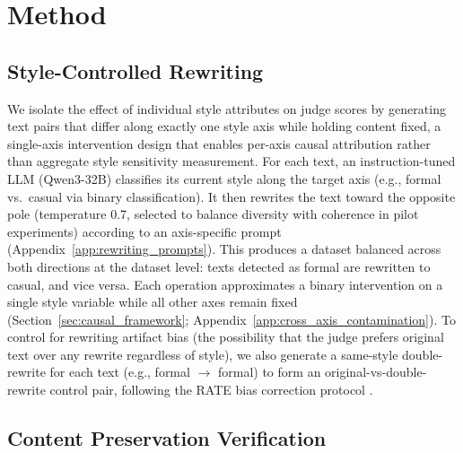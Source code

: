 \section{Method}
\label{sec:method}

\subsection{Style-Controlled Rewriting}
\label{sec:rewriting}

We isolate the effect of individual style attributes on judge scores by generating text pairs that differ along exactly one style axis while holding content fixed, a single-axis intervention design that enables per-axis causal attribution rather than aggregate style sensitivity measurement.
For each text, an instruction-tuned LLM (Qwen3-32B) classifies its current style along the target axis (e.g., formal vs.\ casual via binary classification).
It then rewrites the text toward the opposite pole (temperature 0.7, selected to balance diversity with coherence in pilot experiments) according to an axis-specific prompt (Appendix~\ref{app:rewriting_prompts}).
This produces a dataset balanced across both directions at the dataset level: texts detected as formal are rewritten to casual, and vice versa.
Each operation approximates a binary intervention on a single style variable while all other axes remain fixed (Section~\ref{sec:causal_framework}; Appendix~\ref{app:cross_axis_contamination}).
To control for rewriting artifact bias (the possibility that the judge prefers original text over any rewrite regardless of style), we also generate a same-style double-rewrite for each text (e.g., formal $\to$ formal) to form an original-vs-double-rewrite control pair, following the RATE bias correction protocol \citep{reber2025rate}.

\subsection{Content Preservation Verification}
\label{sec:nli_gate}

